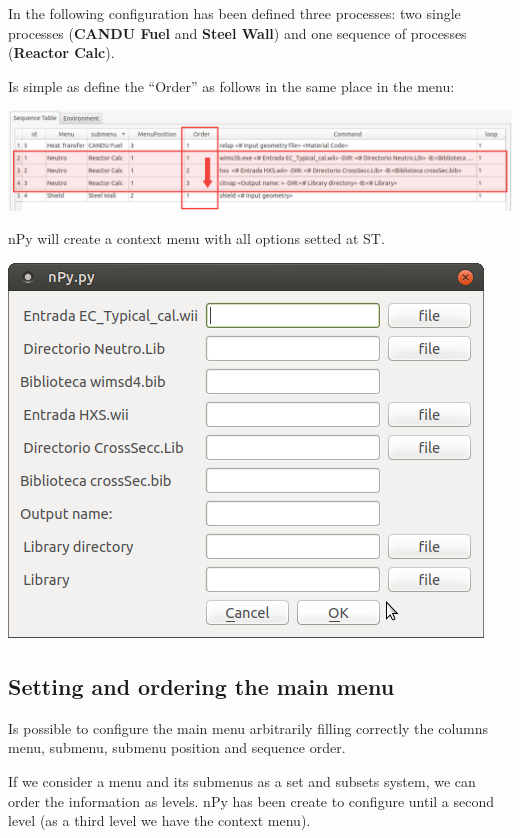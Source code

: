 \documentclass[a4paper,10pt]{article}
\begin{document}
In the following configuration has been defined three processes: two single processes (\textbf{CANDU Fuel} and \textbf{Steel Wall}) and one sequence of processes (\textbf{Reactor Calc}).

Is simple as define the ``Order'' as follows in the same place in the menu:

\begin{center}
 \includegraphics[width=\textwidth]{img/orderingSequenceMark.png}
\end{center}

nPy will create a context menu with all options setted at ST.

\begin{center}
 \includegraphics[width=\textwidth]{img/orderingSequenceContextMenu.png}
\end{center}

\subsection{Setting and ordering the main menu}

Is possible to configure the main menu arbitrarily filling correctly the columns menu, submenu, submenu position and sequence order.

If we consider a menu and its submenus as a set and subsets system, we can order the information as levels. nPy has been create to configure until a second level (as a third level we have the context menu).
\end{document}
